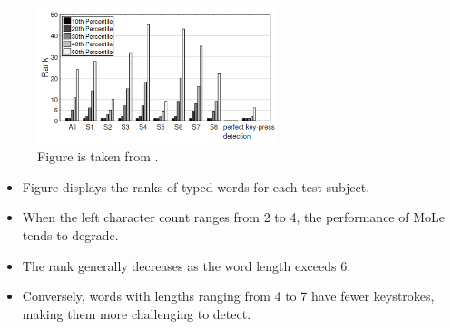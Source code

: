 \documentclass[ucs,9pt]{beamer}
\begin{document}
 
 \begin{frame}
 	\begin{figure}
 		\centering
 		\includegraphics[width=7cm]{imgs/RankOfAverage.png}
 		\caption{Figure is taken from \cite{b1}.}
 	\end{figure}
 \begin{itemize}
	 \item Figure displays the ranks of typed words for each test subject.
	 \item When the left character count ranges from 2 to 4, the performance of MoLe tends to degrade. %
	 
	\item  The rank generally decreases as the word length exceeds 6. 
	 
	\item Conversely, words with lengths ranging from 4 to 7 have fewer keystrokes, making them more challenging to detect. 
	

\end{itemize}
\end{frame}
\end{document}
